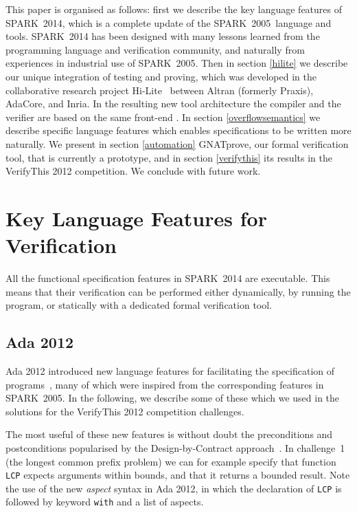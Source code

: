 \documentclass[sttt,final]{svjour}
\newcommand{\hilite}{Hi-Lite}
\newcommand{\oldspark}{SPARK~2005\xspace}
\newcommand{\newspark}{SPARK~2014\xspace}
\begin{document}
This paper is organised as follows: first we describe the key language
features of \newspark, which is a complete update of the \oldspark\
language and tools. \newspark has been designed with many lessons
learned from the programming language and verification community, and
naturally from experiences in industrial use of \oldspark. Then in
section \ref{hilite} we describe our unique integration of testing and
proving, which was developed in the collaborative research project
\hilite\ \cite{hiliteERTS2012} between Altran (formerly Praxis),
AdaCore, and Inria. In the resulting new tool architecture the
compiler and the verifier are based on the same front-end
\cite{ksd2012}. In section \ref{overflowsemantics} we describe
specific language features which enables specifications to be written
more naturally. We present in section \ref{automation} GNATprove, our
formal verification tool, that is currently a prototype, and in
section \ref{verifythis} its results in the VerifyThis 2012
competition. We conclude with future work.

\section{Key Language Features for Verification}
\label{langfeatures}

All the functional specification features in \newspark are executable. This
means that their verification can be performed either dynamically, by running
the program, or statically with a dedicated formal verification tool.

\subsection{Ada 2012}

Ada 2012 introduced new language features for facilitating the
specification of programs~\cite{ada2012rationale}, many of which were
inspired from the corresponding features in \oldspark. In the following,
we describe some of these which we used in the solutions for the
VerifyThis 2012 competition challenges.

The most useful of these new features is without doubt the
preconditions and postconditions popularised by the Design-by-Contract
approach~\cite{meyer:1988:OSC}. In challenge~1 (the longest common
prefix problem) we can for example specify that function \verb|LCP|
expects arguments within bounds, and that it returns a bounded
result. Note the use of the new \textit{aspect} syntax in Ada 2012, in
which the declaration of \verb|LCP| is followed by keyword \verb|with|
and a list of aspects.
\end{document}
